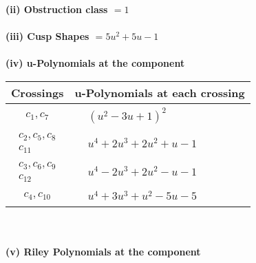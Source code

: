 \documentclass[1p]{elsarticle_modified}
\theoremstyle{definition}
\begin{document}
\flushleft \textbf{(ii) Obstruction class $= 1$}\\~\\
\flushleft \textbf{(iii) Cusp Shapes $= 5 u^2+5 u-1$}\\~\\
\newpage\renewcommand{\arraystretch}{1}
\flushleft \textbf{(iv) u-Polynomials at the component}\newline \\
\begin{tabular}{m{50pt}|m{274pt}}
Crossings & \hspace{64pt}u-Polynomials at each crossing \\
\hline $$\begin{aligned}c_{1},c_{7}\end{aligned}$$&$\begin{aligned}
&(u^2-3 u+1)^2
\end{aligned}$\\
\hline $$\begin{aligned}c_{2},c_{5},c_{8}\\c_{11}\end{aligned}$$&$\begin{aligned}
&u^4+2 u^3+2 u^2+u-1
\end{aligned}$\\
\hline $$\begin{aligned}c_{3},c_{6},c_{9}\\c_{12}\end{aligned}$$&$\begin{aligned}
&u^4-2 u^3+2 u^2- u-1
\end{aligned}$\\
\hline $$\begin{aligned}c_{4},c_{10}\end{aligned}$$&$\begin{aligned}
&u^4+3 u^3+u^2-5 u-5
\end{aligned}$\\
\hline
\end{tabular}\\~\\
\newpage\renewcommand{\arraystretch}{1}
\flushleft \textbf{(v) Riley Polynomials at the component}\newline \\
\end{document}
